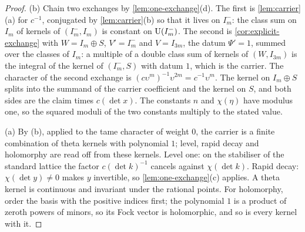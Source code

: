 \begin{proof}
(b) Chain two exchanges by \cref{lem:one-exchange}(d). The first is \cref{lem:carrier}(a) for $c^{-1}$, conjugated by \cref{lem:carrier}(b) so that it lives on $I_m^-$: the class sum on $I_m$ of kernels of $(I_m^-,I_m)$ is constant on $\operatorname{U}(I_m^-)$.
The second is \cref{cor:explicit-exchange} with $W=I_m\oplus S$, $V'=I_m^-$ and $V=I_{3m}$, the datum $\Psi'=1$, summed over the classes of $I_m$: a multiple of a double class sum of kernels of $(W,I_{3m})$ is the integral of the kernel of
$(I_m^-,S)$ with datum $1$, which is the carrier. The character of the second exchange is $(c\upsilon^m)^{-1}\upsilon^{2m}=c^{-1}\upsilon^m$. The kernel on $I_m\oplus S$ splits into the summand of the carrier coefficient and the kernel on $S$, and both sides
are the claim times $c(\det x)$. The constants $n$ and $\chi(\eta)$ have modulus one, so the squared moduli of the two constants multiply to the stated value.

(a) By (b), applied to the tame character of weight $0$, the carrier is a finite combination of theta kernels with polynomial $1$; level, rapid decay and holomorphy are read off from these kernels. Level one: on the stabiliser of the
standard lattice the factor $c(\det k)^{-1}$ cancels against $\chi(\det k)$. Rapid decay: $\chi(\det y)\ne0$ makes $y$ invertible, so \cref{lem:one-exchange}(c) applies. A theta kernel is continuous and invariant under the rational points.
For holomorphy, order the basis with the positive indices first; the polynomial $1$ is a product of zeroth powers of minors, so its Fock vector is holomorphic, and so is every kernel with it.


\end{proof}

